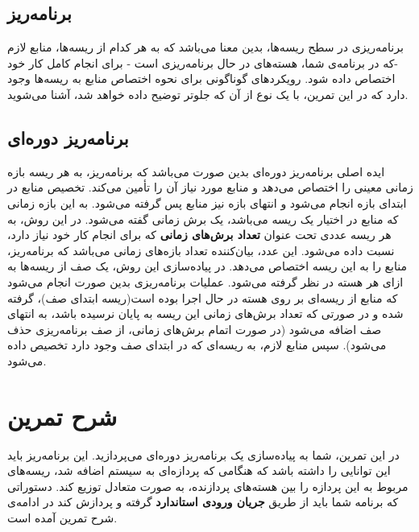 \documentclass{utap}
\begin{document}
    
    	\subsection{برنامه‌ریز\protect{}} %
    	\hspace{5mm}
    برنامه‌ریزی در سطح ریسه‌‌ها، بدین معنا می‌باشد که به هر کدام از ریسه‌ها، منابع لازم -که در برنامه‌ی شما، هسته‌های در حال برنامه‌ریزی است - برای انجام کامل کار خود اختصاص داده شود. رویکردهای گوناگونی برای نحوه اختصاص منابع به ریسه‌ها وجود دارد که در این تمرین، با یک نوع از آن که جلوتر توضیح داده خواهد شد، آشنا می‌شوید.
    	\subsection{برنامه‌ریز دوره‌ای} %
    	\hspace{5mm}
    	ایده اصلی برنامه‌ریز دوره‌ای  بدین صورت می‌باشد که برنامه‌ریز، به هر ریسه بازه زمانی معینی را اختصاص می‌دهد و منابع مورد نیاز آن را تأمین می‌کند. تخصیص منابع در ابتدای بازه انجام می‌شود و انتهای بازه نیز منابع پس گرفته می‌شود. به این بازه زمانی که منابع در اختیار یک ریسه می‌باشد، یک برش زمانی گفته می‌شود.
    	در این روش، به هر ریسه عددی تحت عنوان \textbf{تعداد برش‌های زمانی} که برای انجام کار خود نیاز دارد، نسبت داده می‌شود. این عدد، بیان‌‌کننده تعداد بازه‌های زمانی می‌باشد که برنامه‌ریز، منابع را به این ریسه اختصاص می‌دهد.
    	در پیاده‌سازی این روش، یک صف از ریسه‌‌ها به ازای هر هسته در نظر گرفته می‌شود. عملیات برنامه‌ریزی بدین صورت انجام می‌شود که منابع از ریسه‌ای بر روی هسته در حال اجرا بوده است(ریسه ابتدای صف)، گرفته شده و در صورتی که تعداد برش‌های زمانی این ریسه به پایان نرسیده باشد، به انتهای صف اضافه می‌شود (در صورت اتمام برش‌های زمانی، از صف برنامه‌ریزی حذف می‌شود). سپس منابع لازم، به ریسه‌ای که در ابتدای صف وجود دارد تخصیص داده می‌شود.
    	
    	
	\section{شرح تمرین}
	\hspace{5mm}
	در این تمرین، شما به پیاده‌سازی یک برنامه‌ریز دوره‌ای می‌پردازید. این برنامه‌ریز باید این توانایی را داشته باشد که هنگامی که پردازه‌ای به سیستم اضافه شد، ریسه‌های مربوط به این پردازه را بین هسته‌های پردازنده، به صورت متعادل توزیع کند. دستوراتی که برنامه شما باید از طریق \textbf{جریان ورودی استاندارد} گرفته و پردازش کند در ادامه‌ی شرح تمرین آمده است.
	
\end{document}
